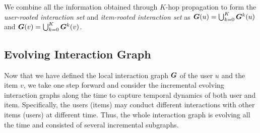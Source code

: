 We combine all the information obtained through $K$-hop propagation to form the \textit{user-rooted interaction set} and \textit{item-rooted interaction set} as $\bm{G}(u) = \bigcup_{k=0}^K \bm{G}^k(u)$ and $\bm{G}(v)=\bigcup_{k=0}^K \bm{G}^k(v)$.



\subsection{Evolving Interaction Graph}
Now that we have defined the local interaction graph $\bm{G}$ of the user $u$ and the item $v$, we take one step forward and consider the incremental evolving interaction graphs along the time to capture temporal dynamics of both user and item.
Specifically, the users (items) may conduct different interactions with other items (users) at different time.
Thus, the whole interaction graph is evolving all the time and consisted of several incremental subgraphs.

